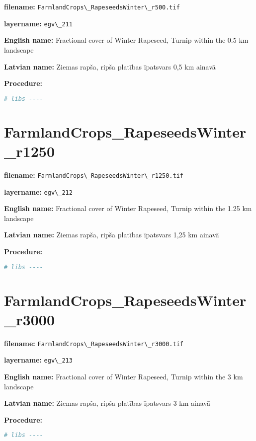 \documentclass[
]{book}
\newcommand{\passthrough}[1]{#1}
\begin{document}
\textbf{filename:} \passthrough{\lstinline!FarmlandCrops\_RapeseedsWinter\_r500.tif!}

\textbf{layername:} \passthrough{\lstinline!egv\_211!}

\textbf{English name:} Fractional cover of Winter Rapeseed, Turnip within the 0.5 km landscape

\textbf{Latvian name:} Ziemas rapša, ripša platības īpatsvars 0,5 km ainavā

\textbf{Procedure:}

\begin{lstlisting}[language=R]
# libs ----
\end{lstlisting}

\section{FarmlandCrops\_RapeseedsWinter\_r1250}\label{ch06.212}

\textbf{filename:} \passthrough{\lstinline!FarmlandCrops\_RapeseedsWinter\_r1250.tif!}

\textbf{layername:} \passthrough{\lstinline!egv\_212!}

\textbf{English name:} Fractional cover of Winter Rapeseed, Turnip within the 1.25 km landscape

\textbf{Latvian name:} Ziemas rapša, ripša platības īpatsvars 1,25 km ainavā

\textbf{Procedure:}

\begin{lstlisting}[language=R]
# libs ----
\end{lstlisting}

\section{FarmlandCrops\_RapeseedsWinter\_r3000}\label{ch06.213}

\textbf{filename:} \passthrough{\lstinline!FarmlandCrops\_RapeseedsWinter\_r3000.tif!}

\textbf{layername:} \passthrough{\lstinline!egv\_213!}

\textbf{English name:} Fractional cover of Winter Rapeseed, Turnip within the 3 km landscape

\textbf{Latvian name:} Ziemas rapša, ripša platības īpatsvars 3 km ainavā

\textbf{Procedure:}

\begin{lstlisting}[language=R]
# libs ----
\end{lstlisting}
\end{document}
